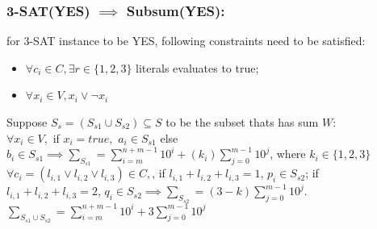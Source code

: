 \documentclass[9pt]{extarticle}
\begin{document}
\subsubsection*{3-SAT(YES) $\implies$ Subsum(YES):}
for 3-SAT instance to be YES, following constraints need to be satisfied:
\begin{itemize}
  \item $\forall c_i \in C, \exists r \in \{1, 2, 3\}$ literals evaluates to true; 
  \item $\forall x_i \in V, x_i \lor \neg x_i$ 
\end{itemize}
Suppose $S_s = (S_{s1} \cup S_{s2})\subseteq S$ to be the subset thats has sum $W$:\\
$\forall x_i \in V,$ if $ x_i = true, $ $a_i \in S_{s1}$ else $b_i \in S_{s1} \implies \sum_{S_{s1}} = \sum_{i=m}^{n+m-1} 10^i + (k_i)\sum_{j=0}^{m-1}10^j$, where $k_i \in \{1, 2, 3\} $\\
$\forall c_i = (l_{i, 1} \lor l_{i, 2} \lor l_{i, 3})\in C,$, if $l_{i, 1} + l_{i, 2} + l_{i, 3} = 1$, $p_i \in S_{s2}$; if $l_{i, 1} + l_{i, 2} + l_{i, 3} = 2$, $q_i \in S_{s2} \implies 
\sum_{S_{s2}} = (3 - k)\sum_{j=0}^{m-1} 10^j$. \\
$\sum_{S_{s1} \cup S_{s2}} = \sum_{i=m}^{n+m-1} 10^i + 3\sum_{j=0}^{m-1} 10^j$
\end{document}
